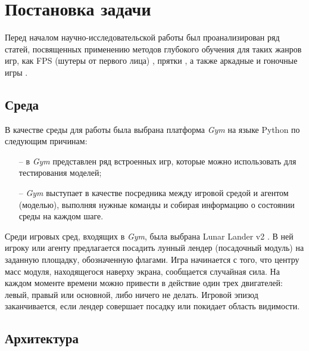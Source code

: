 \chapter{Постановка задачи}
\label{cha:analysis}
%
%

Перед началом научно-исследовательской работы был проанализирован ряд статей, посвященных применению методов глубокого обучения для таких жанров игр, как FPS (шутеры от первого лица) \cite{bergdahl2020augmenting}, прятки \cite{baker2019emergent}, а также аркадные и гоночные игры \cite{tufano2022using}.

\section{Среда}

В качестве среды для работы была выбрана платформа \textit{Gym} на языке Python \cite{Gym} по следующим причинам:
\begin{itemize}
	\item[--] в \textit{Gym} представлен ряд встроенных игр, которые можно использовать для тестирования моделей;
	\item[--] \textit{Gym} выступает в качестве посредника между игровой средой и агентом (моделью), выполняя нужные команды и собирая информацию о состоянии среды на каждом шаге.
\end{itemize}

Среди игровых сред, входящих в \textit{Gym}, была выбрана Lunar Lander v2 \cite{lunarlanderv2}. В ней игроку или агенту предлагается посадить лунный лендер (посадочный модуль) на заданную площадку, обозначенную флагами. Игра начинается с того, что центру масс модуля, находящегося наверху экрана, сообщается случайная сила. На каждом моменте времени можно привести в действие один трех двигателей: левый, правый или основной, либо ничего не делать. Игровой эпизод заканчивается, если лендер совершает посадку или покидает область видимости.

\section{Архитектура}

